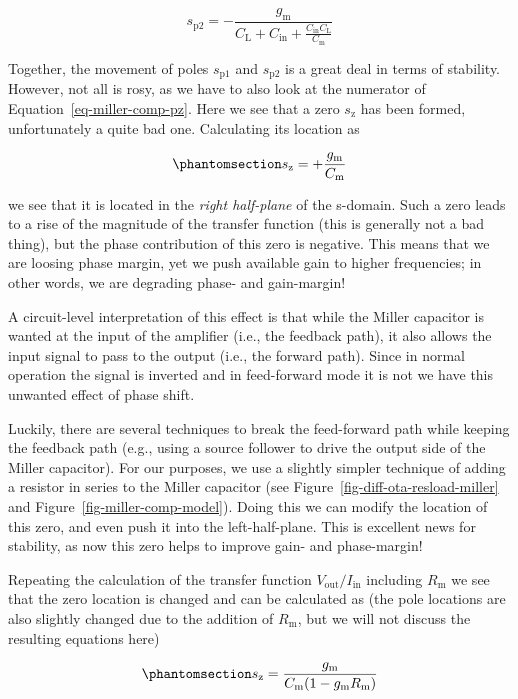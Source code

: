 \documentclass[
  a4paper,
  DIV=11,
  numbers=noendperiod]{scrartcl}
\begin{document}
\[
s_\mathrm{p2} = -\frac{g_\mathrm{m}}{C_\mathrm{L} + C_\mathrm{in} + \frac{C_\mathrm{in} C_\mathrm{L}}{C_\mathrm{m}}}
\]

Together, the movement of poles \(s_\mathrm{p1}\) and \(s_\mathrm{p2}\)
is a great deal in terms of stability. However, not all is rosy, as we
have to also look at the numerator of Equation~\ref{eq-miller-comp-pz}.
Here we see that a zero \(s_\mathrm{z}\) has been formed, unfortunately
a quite bad one. Calculating its location as

\begin{equation}\phantomsection\label{eq-miller-zero}{
s_\mathrm{z} = +\frac{g_\mathrm{m}}{C_\mathrm{m}}
}\end{equation}

we see that it is located in the \emph{right half-plane} of the
s-domain. Such a zero leads to a rise of the magnitude of the transfer
function (this is generally not a bad thing), but the phase contribution
of this zero is negative. This means that we are loosing phase margin,
yet we push available gain to higher frequencies; in other words, we are
degrading phase- and gain-margin!

A circuit-level interpretation of this effect is that while the Miller
capacitor is wanted at the input of the amplifier (i.e., the feedback
path), it also allows the input signal to pass to the output (i.e., the
forward path). Since in normal operation the signal is inverted and in
feed-forward mode it is not we have this unwanted effect of phase shift.

Luckily, there are several techniques to break the feed-forward path
while keeping the feedback path (e.g., using a source follower to drive
the output side of the Miller capacitor). For our purposes, we use a
slightly simpler technique of adding a resistor in series to the Miller
capacitor (see Figure~\ref{fig-diff-ota-resload-miller} and
Figure~\ref{fig-miller-comp-model}). Doing this we can modify the
location of this zero, and even push it into the left-half-plane. This
is excellent news for stability, as now this zero helps to improve gain-
and phase-margin!

Repeating the calculation of the transfer function
\(V_\mathrm{out} / I_\mathrm{in}\) including \(R_\mathrm{m}\) we see
that the zero location is changed and can be calculated as (the pole
locations are also slightly changed due to the addition of
\(R_\mathrm{m}\), but we will not discuss the resulting equations here)

\begin{equation}\phantomsection\label{eq-miller-zero-comp}{
s_\mathrm{z} = \frac{g_\mathrm{m}}{C_\mathrm{m} (1 - g_\mathrm{m}R_\mathrm{m})}
}\end{equation}
\end{document}
